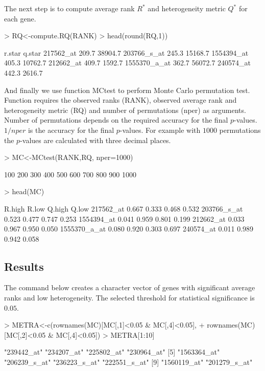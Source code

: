 \documentclass[a4paper]{report}
\begin{document}
The next step is to compute average rank $R^*$ and heterogeneity metric $Q^*$ for each gene.
\begin{Schunk}
\begin{Sinput}
> RQ<-compute.RQ(RANK)
> head(round(RQ,1))
\end{Sinput}
\begin{Soutput}
             r.star  q.star
217562_at     209.7 38904.7
203766_s_at   245.3 15168.7
1554394_at    405.3 10762.7
212662_at     409.7  1592.7
1555370_a_at  362.7 56072.7
240574_at     442.3  2616.7
\end{Soutput}
\end{Schunk}
And finally we use function {\ttfamily MCtest} to perform Monte Carlo permutation test. Function requires the observed ranks ({\ttfamily RANK}), observed average rank and heterogeneity metric ({\ttfamily RQ}) and number of permutations ({\ttfamily nper}) as arguments. Number of permutations depends on the required accuracy for the final $p$-values. $1/nper$ is the accuracy for the final $p$-values. For example with $1000$ permutations the $p$-values are calculated with three decimal places.  
\begin{Schunk}
\begin{Sinput}
> MC<-MCtest(RANK,RQ, nper=1000)
\end{Sinput}
\begin{Soutput}
100   200   300   400   500   600   700   800   900   1000   
\end{Soutput}
\begin{Sinput}
> head(MC)
\end{Sinput}
\begin{Soutput}
             R.high R.low Q.high Q.low
217562_at     0.667 0.333  0.468 0.532
203766_s_at   0.523 0.477  0.747 0.253
1554394_at    0.041 0.959  0.801 0.199
212662_at     0.033 0.967  0.950 0.050
1555370_a_at  0.080 0.920  0.303 0.697
240574_at     0.011 0.989  0.942 0.058
\end{Soutput}
\end{Schunk}
\subsection*{Results}
The command below creates a character vector of genes with significant average ranks and low heterogeneity. The selected threshold for statistical significance is $0.05$.
\begin{Schunk}
\begin{Sinput}
> METRA<-c(rownames(MC)[MC[,1]<0.05 & MC[,4]<0.05], 
+ rownames(MC)[MC[,2]<0.05 & MC[,4]<0.05])
> METRA[1:10]
\end{Sinput}
\begin{Soutput}
 [1] "239442_at"   "234207_at"   "225802_at"   "230964_at"  
 [5] "1563364_at"  "206239_s_at" "236223_s_at" "222551_s_at"
 [9] "1560119_at"  "201279_s_at"
\end{Soutput}
\end{Schunk}
\end{document}
